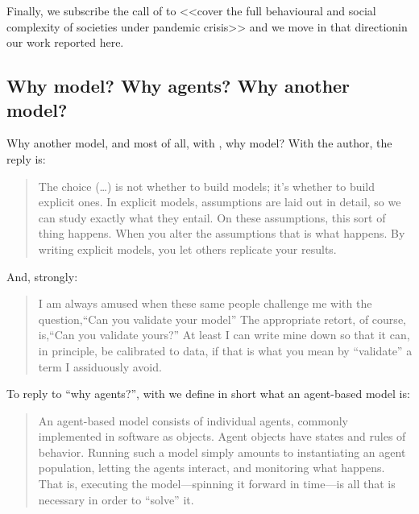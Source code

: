\documentclass[graybox]{svmult}
\begin{document}
Finally, we subscribe the call of \cite{squazzoni2020} to <<cover the full behavioural and social complexity of societies under pandemic crisis>> and we move in that directionin our work reported here. 

\subsection{Why model? Why agents? Why another model?}
\label{why}

Why another model, and most of all, with \cite{epstein2008model}, why model? With the author, the reply is: 
\begin{quote}
The choice (\ldots) is not whether to build models; it's whether to build explicit ones. In explicit models, assumptions are laid out in detail, so we can study exactly what they entail. On these assumptions, this sort of thing happens. When you alter the assumptions that is what happens. By writing explicit models, you let others replicate your results.
\end{quote}

And, strongly:
\begin{quote} 
I am always amused when these same people challenge me with the question,``Can you validate your model'' The appropriate retort, of course, is,``Can you validate yours?'' At least I can write mine down so that it can, in principle, be calibrated to data, if that is what you mean by ``validate'' a term I assiduously avoid.
\end{quote}

To reply to ``why agents?'', with \cite{axtell2000agents} we define in short what an agent-based model is:
\begin{quote} 
An agent-based model consists of individual agents, commonly implemented in software as objects. Agent objects have states and rules of behavior. Running such a model simply amounts to instantiating an agent population, letting the agents interact, and monitoring what happens. That is, executing the model---spinning it forward in time---is all that is necessary in order to ``solve'' it.
\end{quote}
\end{document}
